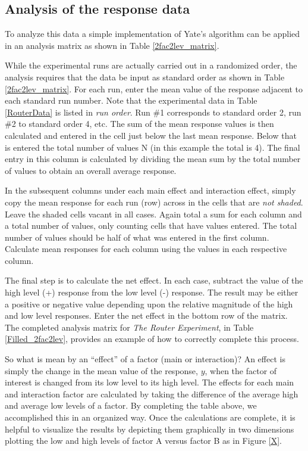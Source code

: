 \subsection{Analysis of the response data}
To analyze this data a simple implementation of Yate's algorithm can be applied in an analysis matrix as shown in Table \ref{2fac2lev_matrix}.



While the experimental runs are actually carried out in a randomized order, the analysis requires that the data be input as standard order as shown in Table \ref{2fac2lev_matrix}. For each run, enter the mean value of the response adjacent to each standard run number.  Note that the experimental data in Table \ref{RouterData} is listed in \textit{run order}. Run \#1 corresponds to standard order 2, run \#2 to standard order 4, etc. The sum of the mean response values is then calculated and entered in the cell just below the last mean response.  Below that is entered the total number of values N (in this example the total is 4). The final entry in this column is calculated by dividing the mean sum by the total number of values to obtain an overall average response.

In the subsequent columns under each main effect and interaction effect, simply copy the mean response for each run (row) across in the cells that are \textit{not shaded}.  Leave the shaded cells vacant in all cases. Again total a sum for each column and a total number of values, only counting cells that have values entered.  The total number of values should be half of what was entered in the first column.  Calculate mean responses for each column using the values in each respective column.

The final step is to calculate the net effect.  In each case, subtract the value of the high level (+) response from the low level (-) response.  The result may be either a positive or negative value depending upon the relative magnitude of the high and low level responses.  Enter the net effect in the  bottom row of the matrix.  The completed analysis matrix for \textit{The Router Experiment}, in Table \ref{Filled_2fac2lev}, provides an example of how to correctly complete this process.




So what is mean by an ``effect'' of a factor (main or interaction)?  An effect is simply the change in the mean value of the response, $y$, when the factor of interest is changed from its low level to its high level.  The effects for each main and interaction factor are calculated by taking the difference of the average high and average low levels of a factor. By completing the table above, we accomplished this in an organized way. Once the calculations are complete, it is helpful to visualize the results by depicting them graphically in two dimensions plotting the low and high levels of factor A versus factor B as in Figure \ref{X}.

